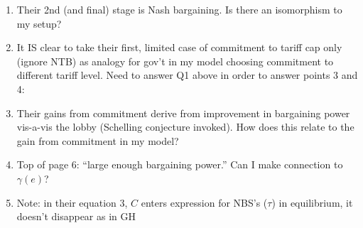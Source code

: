 \documentclass[12pt]{article}
\newcommand{\ga}{\gamma}
\begin{document}
\begin{itemize}
\begin{enumerate}
			\item Their 2nd (and final) stage is Nash bargaining. Is there an isomorphism to my setup?
			\item It IS clear to take their first, limited case of commitment to tariff cap only (ignore NTB) as analogy for gov't in my model choosing commitment to different tariff level. Need to answer Q1 above in order to answer points 3 and 4:
			\item Their gains from commitment derive from improvement in bargaining power vis-a-vis the lobby (Schelling conjecture invoked). How does this relate to the gain from commitment in my model?
			\item Top of page 6: ``large enough bargaining power.'' Can I make connection to $\ga(e)$?
			\item Note: in their equation 3, $C$ enters expression for NBS's ($\tau$) in equilibrium, it doesn't disappear as in GH
		\end{enumerate}
\end{itemize}
\end{document}

